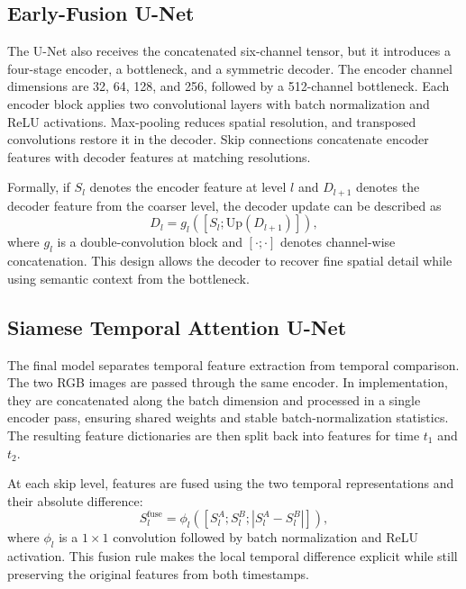 \documentclass[11pt,a4paper]{article}
\begin{document}
\subsection{Early-Fusion U-Net}

The U-Net also receives the concatenated six-channel tensor, but it introduces a four-stage encoder, a bottleneck, and a symmetric decoder. The encoder channel dimensions are 32, 64, 128, and 256, followed by a 512-channel bottleneck. Each encoder block applies two convolutional layers with batch normalization and ReLU activations. Max-pooling reduces spatial resolution, and transposed convolutions restore it in the decoder. Skip connections concatenate encoder features with decoder features at matching resolutions.

Formally, if $S_l$ denotes the encoder feature at level $l$ and $D_{l+1}$ denotes the decoder feature from the coarser level, the decoder update can be described as
\begin{equation}
  D_l = g_l\left([S_l; \mathrm{Up}(D_{l+1})]\right),
\end{equation}
where $g_l$ is a double-convolution block and $[\cdot;\cdot]$ denotes channel-wise concatenation. This design allows the decoder to recover fine spatial detail while using semantic context from the bottleneck.

\subsection{Siamese Temporal Attention U-Net}

The final model separates temporal feature extraction from temporal comparison. The two RGB images are passed through the same encoder. In implementation, they are concatenated along the batch dimension and processed in a single encoder pass, ensuring shared weights and stable batch-normalization statistics. The resulting feature dictionaries are then split back into features for time $t_1$ and $t_2$.

At each skip level, features are fused using the two temporal representations and their absolute difference:
\begin{equation}
  S_l^{\mathrm{fuse}}
  =
  \phi_l\left([S_l^A;S_l^B;|S_l^A-S_l^B|]\right),
  \label{eq:fusion}
\end{equation}
where $\phi_l$ is a $1\times1$ convolution followed by batch normalization and ReLU activation. This fusion rule makes the local temporal difference explicit while still preserving the original features from both timestamps.
\end{document}
